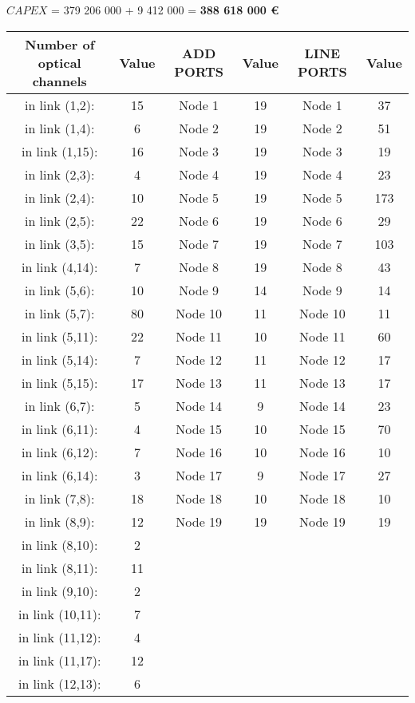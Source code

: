 $CAPEX$ = 379 206 000 + 9 412 000 = \textbf{388 618 000 \euro}\\

\begin{table}[h!]
\centering
\begin{tabular}{|| c | c || c | c || c | c ||}
 \hline
 Number of optical channels & Value & ADD PORTS & Value & LINE PORTS & Value \\
 \hline\hline
in link (1,2): & 15& Node 1 & 19 & Node 1 & 37 \\
in link (1,4): & 6& Node 2 & 19 & Node 2 & 51 \\
in link (1,15): & 16& Node 3 & 19 & Node 3 & 19 \\
in link (2,3): & 4& Node 4 & 19 & Node 4 & 23 \\
in link (2,4): & 10& Node 5 & 19 & Node 5 & 173 \\
in link (2,5): & 22& Node 6 & 19 & Node 6 & 29 \\
in link (3,5): & 15& Node 7 & 19 & Node 7 & 103 \\
in link (4,14): & 7& Node 8 & 19 & Node 8 & 43 \\
in link (5,6): & 10& Node 9 & 14 & Node 9 & 14 \\
in link (5,7): & 80& Node 10 & 11 & Node 10 & 11 \\
in link (5,11): & 22& Node 11 & 10 & Node 11 & 60 \\
in link (5,14): & 7& Node 12 & 11 & Node 12 & 17 \\
in link (5,15): & 17& Node 13 & 11 & Node 13 & 17 \\
in link (6,7): & 5& Node 14 & 9 & Node 14 & 23 \\
in link (6,11): & 4& Node 15 & 10 & Node 15 & 70 \\
in link (6,12): & 7& Node 16 & 10 & Node 16 & 10 \\
in link (6,14): & 3& Node 17 & 9 & Node 17 & 27 \\
in link (7,8): & 18& Node 18 & 10 & Node 18 & 10 \\
in link (8,9): & 12& Node 19 & 19 & Node 19 & 19 \\
in link (8,10): & 2& & & & \\
in link (8,11): & 11& & & & \\
in link (9,10): & 2& & & & \\
in link (10,11): & 7& & & & \\
in link (11,12): & 4& & & & \\
in link (11,17): & 12& & & & \\
in link (12,13): & 6& & & & \\

\end{tabular}
\end{table}
